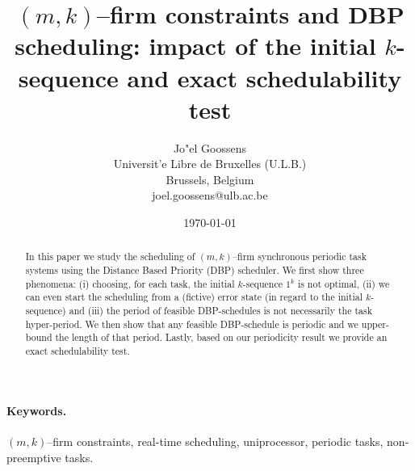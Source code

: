 \documentclass{article}
\newcommand{\mkf}{$(m,k)$--firm}
\begin{document}
\title{\mkf{} constraints and DBP scheduling: impact of the initial $k$-sequence and exact schedulability test}

\date{\today}

\author{
Jo\a"el Goossens\\Universit\a'e Libre de Bruxelles (U.L.B.)\\Brussels, Belgium\\joel.goossens@ulb.ac.be
}

\maketitle
\thispagestyle{empty}



\begin{abstract}
In this paper we study the scheduling of $(m,k)$--firm synchronous periodic task systems using the Distance Based Priority (DBP) scheduler. We first show three phenomena: (i) choosing, for each task, the initial $k$-sequence $1^k$ is not optimal, (ii) we can even start the scheduling from a (fictive) error state (in regard to the initial $k$-sequence) and (iii) the period of feasible DBP-schedules is not necessarily the task hyper-period. We then show that any feasible DBP-schedule is periodic and we upper-bound the length of that period. Lastly, based on our periodicity result we provide an exact schedulability test.
\end{abstract}

\paragraph{Keywords.} $(m,k)$--firm constraints, real-time scheduling, uniprocessor, periodic tasks, non-preemptive tasks.
\end{document}
